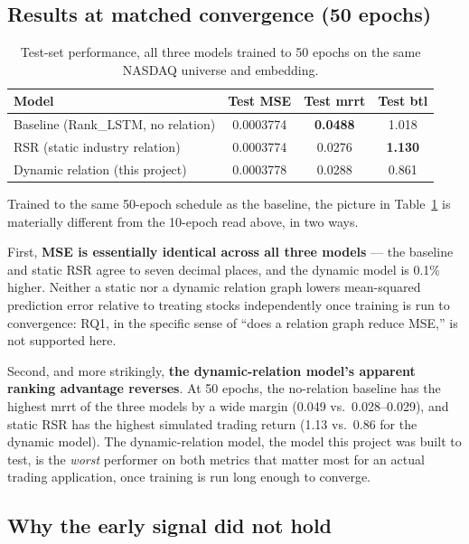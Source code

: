 \documentclass[12pt]{article}
\begin{document}
\subsection{Results at matched convergence (50 epochs)}

\begin{table}[h]
\centering
\caption{Test-set performance, all three models trained to 50 epochs on the same NASDAQ universe
and embedding.}
\label{tab:results50}
\begin{tabular}{lccc}
\toprule
Model & Test MSE & Test mrrt & Test btl \\
\midrule
Baseline (Rank\_LSTM, no relation) & 0.0003774 & \textbf{0.0488} & 1.018 \\
RSR (static industry relation) & 0.0003774 & 0.0276 & \textbf{1.130} \\
Dynamic relation (this project) & 0.0003778 & 0.0288 & 0.861 \\
\bottomrule
\end{tabular}
\end{table}

Trained to the same 50-epoch schedule as the baseline, the picture in
Table~\ref{tab:results50} is materially different from the 10-epoch read above, in two ways.

First, \textbf{MSE is essentially identical across all three models} --- the baseline and static
RSR agree to seven decimal places, and the dynamic model is 0.1\% higher. Neither a static nor a
dynamic relation graph lowers mean-squared prediction error relative to treating stocks
independently once training is run to convergence: RQ1, in the specific sense of ``does a relation
graph reduce MSE,'' is not supported here.

Second, and more strikingly, \textbf{the dynamic-relation model's apparent ranking advantage
reverses}. At 50 epochs, the no-relation baseline has the highest mrrt of the three models by a
wide margin (0.049 vs.\ 0.028--0.029), and static RSR has the highest simulated trading return
(1.13 vs.\ 0.86 for the dynamic model). The dynamic-relation model, the model this project was
built to test, is the \emph{worst} performer on both metrics that matter most for an actual
trading application, once training is run long enough to converge.

\subsection{Why the early signal did not hold}
\end{document}
